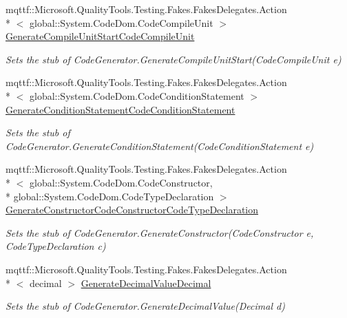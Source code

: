 \begin{DoxyCompactItemize}
mqttf\-::\-Microsoft.\-Quality\-Tools.\-Testing.\-Fakes.\-Fakes\-Delegates.\-Action\\*
$<$ global\-::\-System.\-Code\-Dom.\-Code\-Compile\-Unit $>$ \hyperlink{class_system_1_1_code_dom_1_1_compiler_1_1_fakes_1_1_stub_code_generator_a33db2609db30b596114ca86b4c2c912a}{Generate\-Compile\-Unit\-Start\-Code\-Compile\-Unit}
\begin{DoxyCompactList}\small\item\em Sets the stub of Code\-Generator.\-Generate\-Compile\-Unit\-Start(\-Code\-Compile\-Unit e)\end{DoxyCompactList}\item 
mqttf\-::\-Microsoft.\-Quality\-Tools.\-Testing.\-Fakes.\-Fakes\-Delegates.\-Action\\*
$<$ global\-::\-System.\-Code\-Dom.\-Code\-Condition\-Statement $>$ \hyperlink{class_system_1_1_code_dom_1_1_compiler_1_1_fakes_1_1_stub_code_generator_a0f6ded08cd18c13af2ac9938925878f8}{Generate\-Condition\-Statement\-Code\-Condition\-Statement}
\begin{DoxyCompactList}\small\item\em Sets the stub of Code\-Generator.\-Generate\-Condition\-Statement(\-Code\-Condition\-Statement e)\end{DoxyCompactList}\item 
mqttf\-::\-Microsoft.\-Quality\-Tools.\-Testing.\-Fakes.\-Fakes\-Delegates.\-Action\\*
$<$ global\-::\-System.\-Code\-Dom.\-Code\-Constructor, \\*
global\-::\-System.\-Code\-Dom.\-Code\-Type\-Declaration $>$ \hyperlink{class_system_1_1_code_dom_1_1_compiler_1_1_fakes_1_1_stub_code_generator_a715fd83515da5c40b908663a4ccf8beb}{Generate\-Constructor\-Code\-Constructor\-Code\-Type\-Declaration}
\begin{DoxyCompactList}\small\item\em Sets the stub of Code\-Generator.\-Generate\-Constructor(\-Code\-Constructor e, Code\-Type\-Declaration c)\end{DoxyCompactList}\item 
mqttf\-::\-Microsoft.\-Quality\-Tools.\-Testing.\-Fakes.\-Fakes\-Delegates.\-Action\\*
$<$ decimal $>$ \hyperlink{class_system_1_1_code_dom_1_1_compiler_1_1_fakes_1_1_stub_code_generator_af2bd46ab8b793ed46a826ec1f6c71a69}{Generate\-Decimal\-Value\-Decimal}
\begin{DoxyCompactList}\small\item\em Sets the stub of Code\-Generator.\-Generate\-Decimal\-Value(\-Decimal d)\end{DoxyCompactList}\item 

\end{DoxyCompactItemize}
